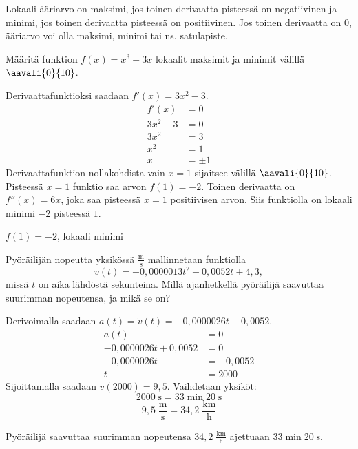
Lokaali ääriarvo on maksimi, jos toinen derivaatta pisteessä on negatiivinen ja minimi, jos
toinen derivaatta pisteessä on positiivinen. Jos toinen derivaatta on $0$, ääriarvo voi olla
maksimi, minimi tai ns. satulapiste.

\begin{esimerkki}
	Määritä funktion $f(x)=x^3-3x$ lokaalit maksimit ja minimit välillä $\aavali{0}{10}$.
	\begin{esimratk}
		Derivaattafunktioksi saadaan $f'(x)=3x^2-3$.
		\begin{align*}
			f'(x) &= 0 \\
			3x^2-3 &= 0 \\
			3x^2 &= 3 \\
			x^2 &= 1 \\
			x &= \pm 1
		\end{align*}
		Derivaattafunktion nollakohdista vain $x = 1$ sijaitsee välillä $\aavali{0}{10}$.
		Pisteessä $x = 1$ funktio saa arvon $f(1) = -2$. Toinen derivaatta on $f''(x)=6x$,
		joka saa pisteessä $x = 1$ positiivisen arvon. Siis funktiolla on lokaali minimi $-2$
		pisteessä $1$.
	\end{esimratk}
	\begin{esimvast}
		$f(1) = -2$, lokaali minimi
	\end{esimvast}
\end{esimerkki}

\begin{esimerkki}
	Pyöräilijän nopeutta yksikössä $\mathrm{\frac{m}{s}}$ mallinnetaan funktiolla %
	\[ v(t) = -0,0000013 t^2 + 0,0052 t + 4,3, \]
	missä $t$ on aika lähdöstä sekunteina. Millä ajanhetkellä pyöräilijä saavuttaa suurimman nopeutensa, ja mikä se on?
	\begin{esimratk}
		Derivoimalla saadaan $a(t) = \dot{v}(t) = -0,0000026 t + 0,0052$.
		\begin{align*}
			a(t) &= 0 \\
			-0,0000026 t + 0,0052 &= 0 \\
			-0,0000026 t &= -0,0052 \\
			t &= 2000
		\end{align*}
		Sijoittamalla saadaan $v(2000) = 9,5$.
		Vaihdetaan yksiköt:
		\[ 2000 \; \mathrm{s} = 33 \; \mathrm{min} \; 20 \; \mathrm{s} \]
		\[ 9,5 \; \mathrm{\frac{m}{s}} =  34,2 \; \mathrm{\frac{km}{h}} \]
	\end{esimratk}
	\begin{esimvast}
		Pyöräilijä saavuttaa suurimman nopeutensa $34,2 \; \mathrm{\frac{km}{h}}$ ajettuaan $33 \; \mathrm{min} \; 20 \; \mathrm{s}$.
	\end{esimvast}
\end{esimerkki}

